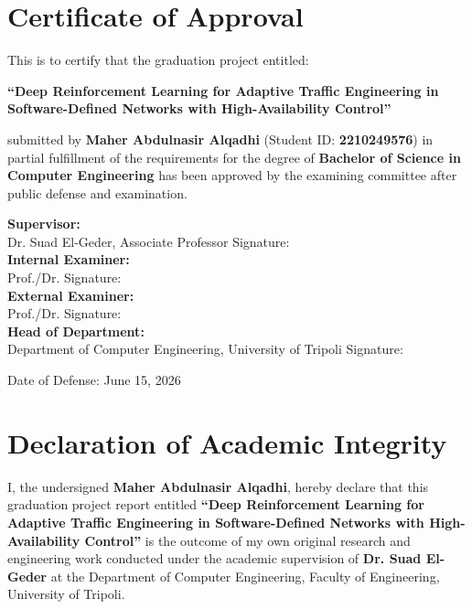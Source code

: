 \documentclass[12pt,a4paper,oneside]{report}
\begin{document}
\chapter*{Certificate of Approval}

This is to certify that the graduation project entitled:
\begin{center}
    \vspace{2mm}
    \textbf{\large ``Deep Reinforcement Learning for Adaptive Traffic Engineering in Software-Defined Networks with High-Availability Control''}
    \vspace{2mm}
\end{center}
submitted by \textbf{Maher Abdulnasir Alqadhi} (Student ID: \textbf{2210249576}) in partial fulfillment of the requirements for the degree of \textbf{Bachelor of Science in Computer Engineering} has been approved by the examining committee after public defense and examination.

\vspace{1.5cm}

\noindent
\textbf{Supervisor:}\\
Dr. Suad El-Geder, Associate Professor \hfill Signature: \dotfill \\[0.8cm]
\textbf{Internal Examiner:}\\
Prof./Dr. \dotfill \hfill Signature: \dotfill \\[0.8cm]
\textbf{External Examiner:}\\
Prof./Dr. \dotfill \hfill Signature: \dotfill \\[0.8cm]
\textbf{Head of Department:}\\
Department of Computer Engineering, University of Tripoli \hfill Signature: \dotfill

\vfill
\noindent
Date of Defense: June 15, 2026

\clearpage

\chapter*{Declaration of Academic Integrity}

I, the undersigned \textbf{Maher Abdulnasir Alqadhi}, hereby declare that this graduation project report entitled \textbf{``Deep Reinforcement Learning for Adaptive Traffic Engineering in Software-Defined Networks with High-Availability Control''} is the outcome of my own original research and engineering work conducted under the academic supervision of \textbf{Dr. Suad El-Geder} at the Department of Computer Engineering, Faculty of Engineering, University of Tripoli.
\end{document}
